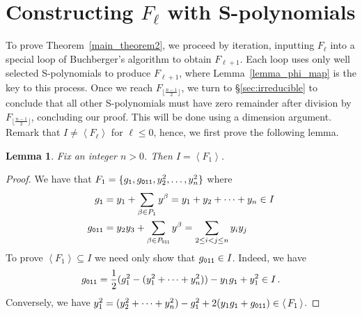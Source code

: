 \documentclass[10pt,a4paper]{article}
\newtheorem{lemma}{Lemma}[section]
\DeclareMathOperator{\la}{\langle}
\DeclareMathOperator{\ra}{\rangle}
\DeclareMathOperator{\sube}{\subseteq}
\begin{document}
\section{\label{proof}Constructing $F_\ell$ with S-polynomials}
To prove Theorem~\ref{main_theorem2}, we proceed by iteration, inputting $F_\ell$ into a special loop of Buchberger's algorithm to obtain $F_{\ell +1}$.
Each loop uses only well selected  S-polynomials to produce $F_{\ell +1}$, where Lemma~\ref{lemma_phi_map} is the key to this process.
Once we reach $F_{ \lfloor \frac{n-1}{2} \rfloor}$, we turn to  \S\ref{sec:irreducible} to conclude that all other S-polynomials must have zero remainder  after division by $F_{ \lfloor \frac{n-1}{2} \rfloor}$, concluding our proof. This will be done using a dimension argument.
Remark that $I\ne \la F_\ell \ra$ for $\ell\le 0$, hence, we first prove the following lemma.
\begin{lemma} \label{F_ellsequence}
	Fix an integer $n>0$. Then $I=\la F_1\ra$.
\end{lemma}
\begin{proof} We have that $F_{1} = \{g_\textnormal{\texttt{1}}, g_{\textnormal{\texttt{011}}}, y_2^2, \dots, y_n^2 \}$ where
 	\begin{align*}
 		g_{\textnormal{\texttt{1}}} &= y_1 + \sum_{\beta \in P_{1}} y^{\beta} = y_1 + y_2 + \dots + y_n \in I\\
 		g_{\textnormal{\texttt{011}}} &= y_2y_3 + \sum_{\beta \in P_{\textnormal{\texttt{011}}}}y^\beta = \sum_{2 \leq i < j \leq n}y_iy_j 
	\end{align*}
	To prove {$\la F_1 \ra \sube I $} we need only show that $g_{\textnormal{\texttt{011}}} \in I$. Indeed, we have
	$$  g_{\textnormal{\texttt{011}}} = \frac{1}{2}(g_1^2 - (y_1^2 + \cdots +y_n^2)) - y_1g_\textnormal{\texttt{1}} + y_1^2  \in I\,.$$
	Conversely, we have   $ y_1^2 =(y_2^2 + \cdots +y_n^2) -g_\textnormal{\texttt{1}}^2  + 2(y_1g_\textnormal{\texttt{1}} + g_{\textnormal{\texttt{011}}}) \in \la F_1 \ra$.
\end{proof}
\end{document}
